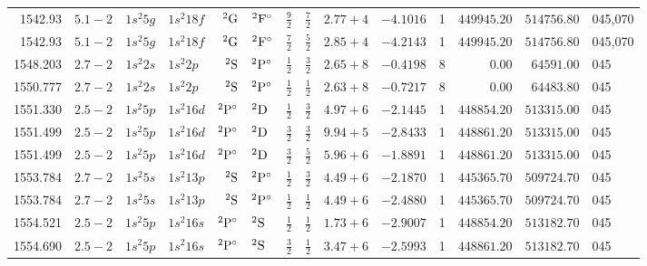 \begin{table}
\begin{tabular}{rrr@{ -- }lr@{ -- }lr@{ -- }llrrr@{ -- }rl}
   1542.93\phantom{00000000} & $5.1-2$ &  $1s^{2}5g$ & $1s^{2}18f$ &       $^{2}{\rm G}$ & $^{2}{\rm F}^\circ$ &  $\frac{9}{2}$ & $\frac{7}{2}$  & $2.77+4$ & $ -4.1016$ &     1 & $449945.20$ & $514756.80$ & 045,070 \\
   1542.93\phantom{00000000} & $5.1-2$ &  $1s^{2}5g$ & $1s^{2}18f$ &       $^{2}{\rm G}$ & $^{2}{\rm F}^\circ$ &  $\frac{7}{2}$ & $\frac{5}{2}$  & $2.85+4$ & $ -4.2143$ &     1 & $449945.20$ & $514756.80$ & 045,070 \\
   1548.203\phantom{0000000} & $2.7-2$ &  $1s^{2}2s$ & $1s^{2}2p$  &       $^{2}{\rm S}$ & $^{2}{\rm P}^\circ$ &  $\frac{1}{2}$ & $\frac{3}{2}$  & $2.65+8$ & $ -0.4198$ &     8 &      $0.00$ &  $64591.00$ & 045 \\
   1550.777\phantom{0000000} & $2.7-2$ &  $1s^{2}2s$ & $1s^{2}2p$  &       $^{2}{\rm S}$ & $^{2}{\rm P}^\circ$ &  $\frac{1}{2}$ & $\frac{1}{2}$  & $2.63+8$ & $ -0.7217$ &     8 &      $0.00$ &  $64483.80$ & 045 \\
   1551.330\phantom{0000000} & $2.5-2$ &  $1s^{2}5p$ & $1s^{2}16d$ & $^{2}{\rm P}^\circ$ & $^{2}{\rm D}$       &  $\frac{1}{2}$ & $\frac{3}{2}$  & $4.97+6$ & $ -2.1445$ &     1 & $448854.20$ & $513315.00$ & 045 \\
   1551.499\phantom{0000000} & $2.5-2$ &  $1s^{2}5p$ & $1s^{2}16d$ & $^{2}{\rm P}^\circ$ & $^{2}{\rm D}$       &  $\frac{3}{2}$ & $\frac{3}{2}$  & $9.94+5$ & $ -2.8433$ &     1 & $448861.20$ & $513315.00$ & 045 \\
   1551.499\phantom{0000000} & $2.5-2$ &  $1s^{2}5p$ & $1s^{2}16d$ & $^{2}{\rm P}^\circ$ & $^{2}{\rm D}$       &  $\frac{3}{2}$ & $\frac{5}{2}$  & $5.96+6$ & $ -1.8891$ &     1 & $448861.20$ & $513315.00$ & 045 \\
   1553.784\phantom{0000000} & $2.7-2$ &  $1s^{2}5s$ & $1s^{2}13p$ &       $^{2}{\rm S}$ & $^{2}{\rm P}^\circ$ &  $\frac{1}{2}$ & $\frac{3}{2}$  & $4.49+6$ & $ -2.1870$ &     1 & $445365.70$ & $509724.70$ & 045 \\
   1553.784\phantom{0000000} & $2.7-2$ &  $1s^{2}5s$ & $1s^{2}13p$ &       $^{2}{\rm S}$ & $^{2}{\rm P}^\circ$ &  $\frac{1}{2}$ & $\frac{1}{2}$  & $4.49+6$ & $ -2.4880$ &     1 & $445365.70$ & $509724.70$ & 045 \\
   1554.521\phantom{0000000} & $2.5-2$ &  $1s^{2}5p$ & $1s^{2}16s$ & $^{2}{\rm P}^\circ$ & $^{2}{\rm S}$       &  $\frac{1}{2}$ & $\frac{1}{2}$  & $1.73+6$ & $ -2.9007$ &     1 & $448854.20$ & $513182.70$ & 045 \\
   1554.690\phantom{0000000} & $2.5-2$ &  $1s^{2}5p$ & $1s^{2}16s$ & $^{2}{\rm P}^\circ$ & $^{2}{\rm S}$       &  $\frac{3}{2}$ & $\frac{1}{2}$  & $3.47+6$ & $ -2.5993$ &     1 & $448861.20$ & $513182.70$ & 045 \\

\end{tabular}
\end{table}
